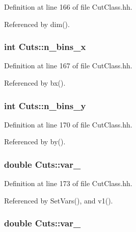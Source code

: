 Definition at line 166 of file Cut\-Class.\-hh.



Referenced by dim().

\subsubsection[{n\-\_\-bins\-\_\-x}]{\setlength{\rightskip}{0pt plus 5cm}int Cuts\-::n\-\_\-bins\-\_\-x\hspace{0.3cm}{\ttfamily [private]}}\label{classCuts_aa85210c0202d13c328e0f1d7c0094804}


Definition at line 167 of file Cut\-Class.\-hh.



Referenced by bx().

\subsubsection[{n\-\_\-bins\-\_\-y}]{\setlength{\rightskip}{0pt plus 5cm}int Cuts\-::n\-\_\-bins\-\_\-y\hspace{0.3cm}{\ttfamily [private]}}\label{classCuts_abca69d36badd0c0a7444a2722db7c7d5}


Definition at line 170 of file Cut\-Class.\-hh.



Referenced by by().

\subsubsection[{var\-\_\-1}]{\setlength{\rightskip}{0pt plus 5cm}double Cuts\-::var\-\_\hspace{0.3cm}{\ttfamily [private]}}\label{classCuts_afd5e22efe86600e5b7540a2d9b4d149e}


Definition at line 173 of file Cut\-Class.\-hh.



Referenced by Set\-Vars(), and v1().

\subsubsection[{var\-\_\-2}]{\setlength{\rightskip}{0pt plus 5cm}double Cuts\-::var\-\_\hspace{0.3cm}{\ttfamily [private]}}\label{classCuts_a278df7d02bf3adcec75fb3a36302af99}


